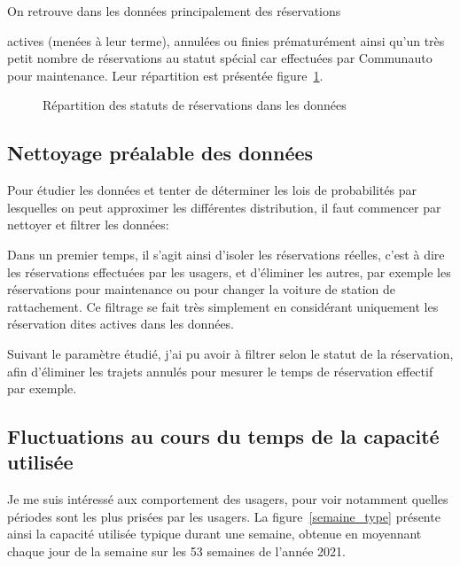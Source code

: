 \documentclass[12pt,a4paper]{article}
\theoremstyle{definition}
\begin{document}
On retrouve dans les données principalement des réservations {actives (menées à leur terme), annulées ou finies prématurément ainsi qu'un très petit nombre de réservations au statut spécial car effectuées par Communauto pour maintenance. Leur répartition est présentée figure~\ref{Répartition}.

\begin{figure}[!h]
\label{Répartition}
\centering
{}
\caption{Répartition des statuts de réservations dans les données}
\end{figure}
 	
 	
\subsection{Nettoyage préalable des  données}
Pour étudier les données et tenter de déterminer les lois de probabilités par lesquelles on peut approximer les différentes distribution, il faut commencer par nettoyer et filtrer les données:

Dans un premier temps, il s'agit ainsi d'isoler les réservations réelles, c'est à dire les réservations effectuées par les usagers, et d'éliminer les autres, par exemple les réservations pour maintenance ou pour changer la voiture de station de rattachement.
Ce filtrage se fait très simplement en considérant uniquement les réservation dites actives dans les données.	

Suivant le paramètre étudié, j'ai pu avoir à filtrer selon le statut de la réservation, afin d'éliminer les trajets annulés pour mesurer le temps de réservation effectif par exemple.



\subsection{Fluctuations au cours du temps de la capacité utilisée}

Je me suis intéressé aux comportement des usagers, pour voir notamment quelles périodes sont les plus prisées par les usagers. La figure~\ref{semaine_type} présente ainsi la capacité utilisée typique durant une semaine, obtenue en moyennant chaque jour de la semaine sur les 53 semaines de l'année 2021.

}
\end{document}

